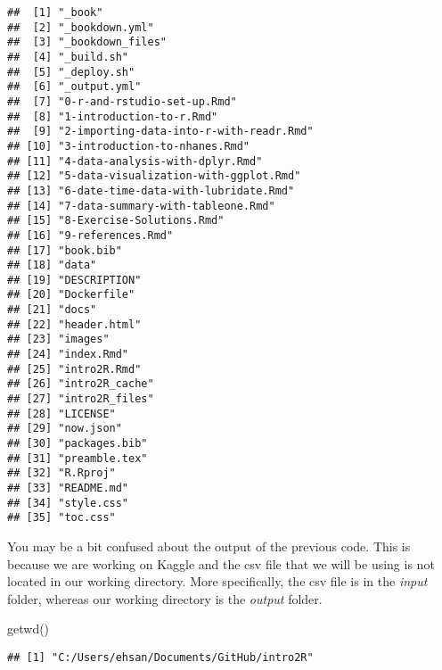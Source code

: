 \documentclass[
]{book}
\newenvironment{Shaded}{\begin{snugshade}}{\end{snugshade}}
\newcommand{\FunctionTok}[1]{\textcolor[rgb]{0.00,0.00,0.00}{#1}}
\newcommand{\NormalTok}[1]{#1}
\begin{document}
\begin{verbatim}
##  [1] "_book"                                 
##  [2] "_bookdown.yml"                         
##  [3] "_bookdown_files"                       
##  [4] "_build.sh"                             
##  [5] "_deploy.sh"                            
##  [6] "_output.yml"                           
##  [7] "0-r-and-rstudio-set-up.Rmd"            
##  [8] "1-introduction-to-r.Rmd"               
##  [9] "2-importing-data-into-r-with-readr.Rmd"
## [10] "3-introduction-to-nhanes.Rmd"          
## [11] "4-data-analysis-with-dplyr.Rmd"        
## [12] "5-data-visualization-with-ggplot.Rmd"  
## [13] "6-date-time-data-with-lubridate.Rmd"   
## [14] "7-data-summary-with-tableone.Rmd"      
## [15] "8-Exercise-Solutions.Rmd"              
## [16] "9-references.Rmd"                      
## [17] "book.bib"                              
## [18] "data"                                  
## [19] "DESCRIPTION"                           
## [20] "Dockerfile"                            
## [21] "docs"                                  
## [22] "header.html"                           
## [23] "images"                                
## [24] "index.Rmd"                             
## [25] "intro2R.Rmd"                           
## [26] "intro2R_cache"                         
## [27] "intro2R_files"                         
## [28] "LICENSE"                               
## [29] "now.json"                              
## [30] "packages.bib"                          
## [31] "preamble.tex"                          
## [32] "R.Rproj"                               
## [33] "README.md"                             
## [34] "style.css"                             
## [35] "toc.css"
\end{verbatim}

You may be a bit confused about the output of the previous code. This is because we are working on Kaggle and the csv file that we will be using is not located in our working directory. More specifically, the csv file is in the \emph{input} folder, whereas our working directory is the \emph{output} folder.

\begin{Shaded}
\begin{Highlighting}[]
\FunctionTok{getwd}\NormalTok{()}
\end{Highlighting}
\end{Shaded}

\begin{verbatim}
## [1] "C:/Users/ehsan/Documents/GitHub/intro2R"
\end{verbatim}
\end{document}
